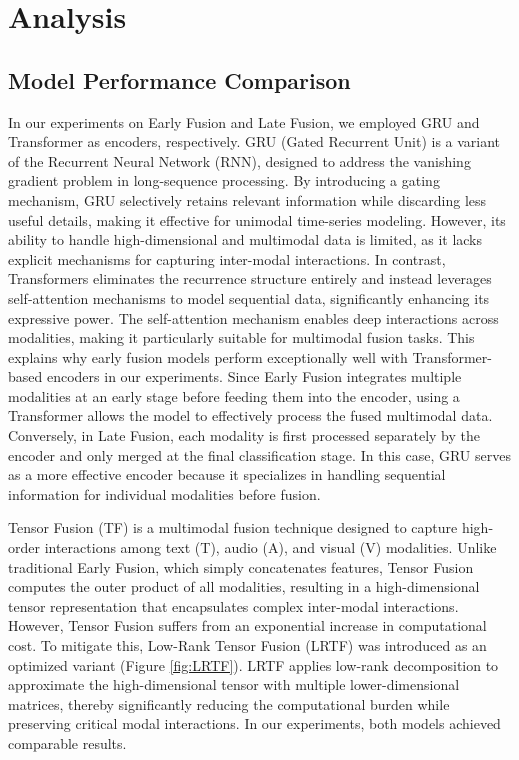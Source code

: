 \documentclass{article}
\begin{document}
\section{Analysis}

\subsection{Model Performance Comparison}
In our experiments on Early Fusion and Late Fusion, we employed GRU and Transformer as encoders, respectively. GRU (Gated Recurrent Unit) is a variant of the Recurrent Neural Network (RNN), designed to address the vanishing gradient problem in long-sequence processing. By introducing a gating mechanism, GRU selectively retains relevant information while discarding less useful details, making it effective for unimodal time-series modeling. However, its ability to handle high-dimensional and multimodal data is limited, as it lacks explicit mechanisms for capturing inter-modal interactions. In contrast, Transformers eliminates the recurrence structure entirely and instead leverages self-attention mechanisms to model sequential data, significantly enhancing its expressive power. The self-attention mechanism enables deep interactions across modalities, making it particularly suitable for multimodal fusion tasks. This explains why early fusion models perform exceptionally well with Transformer-based encoders in our experiments. Since Early Fusion integrates multiple modalities at an early stage before feeding them into the encoder, using a Transformer allows the model to effectively process the fused multimodal data. Conversely, in Late Fusion, each modality is first processed separately by the encoder and only merged at the final classification stage. In this case, GRU serves as a more effective encoder because it specializes in handling sequential information for individual modalities before fusion.


Tensor Fusion (TF) is a multimodal fusion technique designed to capture high-order interactions among text (T), audio (A), and visual (V) modalities. Unlike traditional Early Fusion, which simply concatenates features, Tensor Fusion computes the outer product of all modalities, resulting in a high-dimensional tensor representation that encapsulates complex inter-modal interactions. However, Tensor Fusion suffers from an exponential increase in computational cost. To mitigate this, Low-Rank Tensor Fusion (LRTF) \cite{Liu2018EfficientLM} was introduced as an optimized variant (Figure \ref{fig:LRTF}). LRTF applies low-rank decomposition to approximate the high-dimensional tensor with multiple lower-dimensional matrices, thereby significantly reducing the computational burden while preserving critical modal interactions. In our experiments, both models achieved comparable results. 
\end{document}
